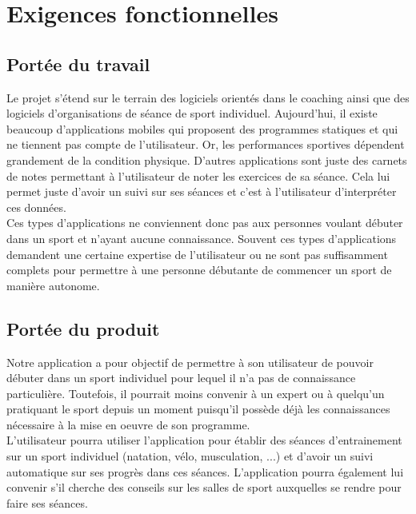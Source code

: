 \chapter{Exigences fonctionnelles}

\section{Portée du travail}

Le projet s'étend sur le terrain des logiciels orientés dans le coaching ainsi que des logiciels d'organisations de séance de sport individuel. Aujourd'hui, il existe beaucoup d'applications mobiles qui proposent des programmes statiques et qui ne tiennent pas compte de l'utilisateur. Or, les performances sportives dépendent grandement de la condition physique. D'autres applications sont juste des carnets de notes permettant à l'utilisateur de noter les exercices de sa séance. Cela lui permet juste d'avoir un suivi sur ses séances et c'est à l'utilisateur d'interpréter ces données.\\

Ces types d'applications ne conviennent donc pas aux personnes voulant débuter dans un sport et n'ayant aucune connaissance. Souvent ces types d'applications demandent une certaine expertise de l'utilisateur ou ne sont pas suffisamment complets pour permettre à une personne débutante de commencer un sport de manière autonome.   

\section{Portée du produit}

Notre application a pour objectif de permettre à son utilisateur de pouvoir débuter dans un sport individuel pour lequel il n'a pas de connaissance particulière. Toutefois, il pourrait moins convenir à un expert ou à quelqu'un pratiquant le sport depuis un moment puisqu'il possède déjà les connaissances nécessaire à la mise en oeuvre de son programme.\\

L'utilisateur pourra utiliser l'application pour établir des séances d'entrainement sur un sport individuel (natation, vélo, musculation, ...) et d'avoir un suivi automatique sur ses progrès dans ces séances. L'application pourra également lui convenir s'il cherche des conseils sur les salles de sport auxquelles se rendre pour faire ses séances.


